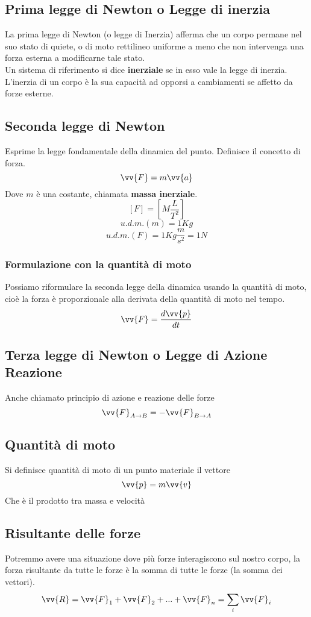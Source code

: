 \documentclass[a4paper]{report}
\begin{document}
  \subsection{Prima legge di Newton o Legge di inerzia}
  La prima legge di Newton (o legge di Inerzia) afferma che un corpo permane nel suo stato di quiete, o di moto rettilineo uniforme a meno che non intervenga una forza esterna a modificarne tale stato.\\
  Un sistema di riferimento si dice \textbf{inerziale} se in esso vale la legge di inerzia.
  L'inerzia di un corpo è la sua capacità ad opporsi a cambiamenti se affetto da forze esterne.

  \subsection{Seconda legge di Newton}
  Esprime la legge fondamentale della dinamica del punto. Definisce il concetto di forza.
  $$ \vv{F} = m\vv{a} $$
  Dove $m$ è una costante, chiamata \textbf{massa inerziale}.
  $$ [F] = [M \frac{L}{T^2}]$$
  $$ u.d.m.(m) = 1Kg$$
  $$ u.d.m.(F) = 1 Kg \frac{m}{s^2} = 1N$$
  \subsubsection{Formulazione con la quantità di moto}
  Possiamo riformulare la seconda legge della dinamica usando la quantità di moto, cioè la forza è proporzionale alla derivata della quantità di moto nel tempo.
  $$ \vv{F} = \frac{d\vv{p}}{dt}$$

  \subsection{Terza legge di Newton o Legge di Azione Reazione}
  Anche chiamato principio di azione e reazione delle forze
  $$ \vv{F}_{A \rightarrow B} = -\vv{F}_{B \rightarrow A} $$

  \subsection{Quantità di moto}
  Si definisce quantità di moto di un punto materiale il vettore
  $$ \vv{p} = m\vv{v} $$
  Che è il prodotto tra massa e velocità

  \subsection{Risultante delle forze}
  Potremmo avere una situazione dove più forze interagiscono sul nostro corpo, la forza risultante da tutte le forze è la somma di tutte le forze (la somma dei vettori).
  $$ \vv{R} = \vv{F}_1 + \vv{F}_2 + ... +\vv{F}_n = \sum_i \vv{F}_i $$
\end{document}
